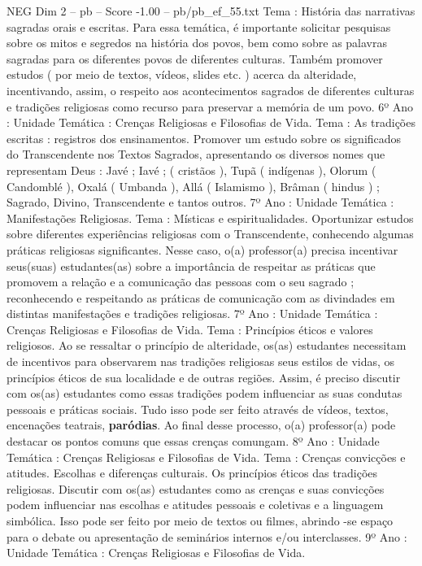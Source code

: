 \begin{textsample}{NEG Dim 2 – pb – Score -1.00 – pb/pb\_ef\_55.txt}
Tema : História das narrativas sagradas orais e escritas.
Para essa temática, é importante solicitar pesquisas sobre os mitos e segredos na história dos povos, bem como sobre as palavras sagradas para os diferentes povos de diferentes culturas.
Também promover estudos ( por meio de textos, vídeos, slides etc. ) acerca da alteridade, incentivando, assim, o respeito aos acontecimentos sagrados de diferentes culturas e tradições religiosas como recurso para preservar a memória de um povo. 6º Ano : Unidade Temática : Crenças Religiosas e Filosofias de Vida.
Tema : As tradições escritas : registros dos ensinamentos.
Promover um estudo sobre os significados do Transcendente nos Textos Sagrados, apresentando os diversos nomes que representam Deus : Javé ; Iavé ; ( cristãos ), Tupã ( indígenas ), Olorum ( Candomblé ), Oxalá ( Umbanda ), Allá ( Islamismo ), Brâman ( hindus ) ; Sagrado, Divino, Transcendente e tantos outros. 7º Ano : Unidade Temática : Manifestações Religiosas.
Tema : Místicas e espiritualidades.
Oportunizar estudos sobre diferentes experiências religiosas com o Transcendente, conhecendo algumas práticas religiosas significantes.
Nesse caso, o(a) professor(a) precisa incentivar seus(suas) estudantes(as) sobre a importância de respeitar as práticas que promovem a relação e a comunicação das pessoas com o seu sagrado ; reconhecendo e respeitando as práticas de comunicação com as divindades em distintas manifestações e tradições religiosas. 7º Ano : Unidade Temática : Crenças Religiosas e Filosofias de Vida.
Tema : Princípios éticos e valores religiosos.
Ao se ressaltar o princípio de alteridade, os(as) estudantes necessitam de incentivos para observarem nas tradições religiosas seus estilos de vidas, os princípios éticos de sua localidade e de outras regiões.
Assim, é preciso discutir com os(as) estudantes como essas tradições podem influenciar as suas condutas pessoais e práticas sociais.
Tudo isso pode ser feito através de vídeos, textos, encenações teatrais, \textbf{paródias}.
Ao final desse processo, o(a) professor(a) pode destacar os pontos comuns que essas crenças comungam. 8º Ano : Unidade Temática : Crenças Religiosas e Filosofias de Vida.
Tema : Crenças convicções e atitudes.
Escolhas e diferenças culturais.
Os princípios éticos das tradições religiosas.
Discutir com os(as) estudantes como as crenças e suas convicções podem influenciar nas escolhas e atitudes pessoais e coletivas e a linguagem simbólica.
Isso pode ser feito por meio de textos ou filmes, abrindo -se espaço para o debate ou apresentação de seminários internos e/ou interclasses. 9º Ano : Unidade Temática : Crenças Religiosas e Filosofias de Vida.

\end{textsample}
